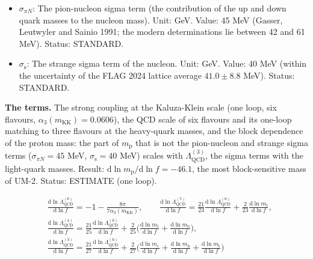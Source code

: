 \documentclass[
  10pt,
]{article}
\begin{document}
\begin{itemize}
  block is \(f^2\) times a four-dimensional space of constant curvature
  \(-H^2\)). Unit: dimensionless. Status: DERIVED.
\item
  \(\sigma_{\pi N}\): The pion-nucleon sigma term (the contribution of
  the up and down quark masses to the nucleon mass). Unit: GeV. Value:
  45 MeV (Gasser, Leutwyler and Sainio 1991; the modern determinations
  lie between 42 and 61 MeV). Status: STANDARD.
\item
  \(\sigma_{\mathrm{s}}\): The strange sigma term of the nucleon. Unit:
  GeV. Value: 40 MeV (within the uncertainty of the FLAG 2024 lattice
  average \(41.0 \pm 8.8\) MeV). Status: STANDARD.
\end{itemize}

\textbf{The terms.} The strong coupling at the Kaluza-Klein scale (one
loop, six flavours, \(\alpha_3(m_{\mathrm{KK}}) = 0.0606\)), the QCD
scale of six flavours and its one-loop matching to three flavours at the
heavy-quark masses, and the block dependence of the proton mass: the
part of \(m_{\mathrm{p}}\) that is not the pion-nucleon and strange
sigma terms (\(\sigma_{\pi N} = 45\) MeV, \(\sigma_{\mathrm{s}} = 40\)
MeV) scales with \(\Lambda^{(3)}_{\mathrm{QCD}}\), the sigma terms with
the light-quark masses. Result:
\(\mathrm{d}\ln m_{\mathrm{p}}/\mathrm{d}\ln f = -46.1\), the most
block-sensitive mass of UM-2. Status: ESTIMATE (one loop).

\[
\begin{aligned}
&\frac{\mathrm{d}\ln\Lambda_{\mathrm{QCD}}^{(6)}}{\mathrm{d}\ln f} = -1 -
 \frac{8\pi}{7\alpha_3(m_{\mathrm{KK}})},\qquad
 \frac{\mathrm{d}\ln\Lambda_{\mathrm{QCD}}^{(5)}}{\mathrm{d}\ln f} =
 \frac{21}{23}\frac{\mathrm{d}\ln\Lambda_{\mathrm{QCD}}^{(6)}}{\mathrm{d}\ln f}
 + \frac{2}{23}\frac{\mathrm{d}\ln m_{\mathrm{t}}}{\mathrm{d}\ln f},\\
&\frac{\mathrm{d}\ln\Lambda_{\mathrm{QCD}}^{(4)}}{\mathrm{d}\ln f} =
 \frac{21}{25}\frac{\mathrm{d}\ln\Lambda_{\mathrm{QCD}}^{(6)}}{\mathrm{d}\ln f}
 + \frac{2}{25}\Big(\frac{\mathrm{d}\ln m_{\mathrm{t}}}{\mathrm{d}\ln f} + \frac{\mathrm{d}\ln
 m_{\mathrm{b}}}{\mathrm{d}\ln f}\Big),\\
&\frac{\mathrm{d}\ln\Lambda_{\mathrm{QCD}}^{(3)}}{\mathrm{d}\ln f} =
 \frac{21}{27}\frac{\mathrm{d}\ln\Lambda_{\mathrm{QCD}}^{(6)}}{\mathrm{d}\ln f}
 + \frac{2}{27}\Big(\frac{\mathrm{d}\ln m_{\mathrm{c}}}{\mathrm{d}\ln f} + \frac{\mathrm{d}\ln
 m_{\mathrm{b}}}{\mathrm{d}\ln f}
 + \frac{\mathrm{d}\ln m_{\mathrm{t}}}{\mathrm{d}\ln f}\Big)
\end{aligned} \tag{FE-84}
\]
\end{document}
